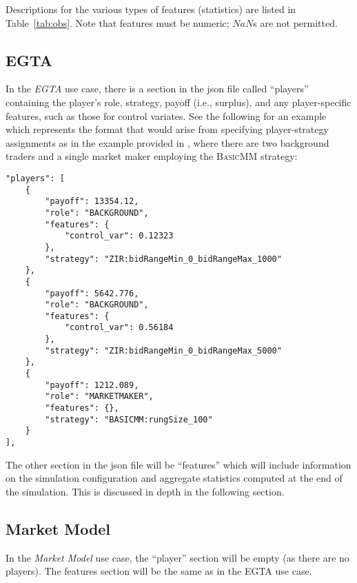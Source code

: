 \documentclass[11pt]{article}
\begin{document}
Descriptions for the various types of features (statistics) are listed in Table~\ref{tab:obs}.
%
Note that features must be numeric; $NaN$s are not permitted.

\subsection{EGTA}

In the \emph{EGTA} use case, there is a section in the json file called ``players'' containing the player's role, strategy, payoff (i.e., surplus), and any player-specific features, such as those for control variates. See the following for an example which represents the format that would arise from specifying player-strategy assignments as in the example provided in , where there are two background traders and a single market maker employing the \textsc{BasicMM} strategy:

\begin{verbatim}
"players": [
    {
        "payoff": 13354.12,
        "role": "BACKGROUND",
        "features": {
            "control_var": 0.12323
        },    
        "strategy": "ZIR:bidRangeMin_0_bidRangeMax_1000"  
    },
    {
        "payoff": 5642.776,
        "role": "BACKGROUND",
        "features": {
            "control_var": 0.56184
        },    
        "strategy": "ZIR:bidRangeMin_0_bidRangeMax_5000"  
    },
    {
        "payoff": 1212.089,
        "role": "MARKETMAKER",
        "features": {},
        "strategy": "BASICMM:rungSize_100"
    }
],
\end{verbatim}

The other section in the json file will be ``features'' which will include information on the simulation configuration and aggregate statistics computed at the end of the simulation. This is discussed in depth in the following section.


\subsection{Market Model}

In the \emph{Market Model} use case, the ``player'' section will be empty (as there are no players). The features section will be the same as in the EGTA use case.
\end{document}
